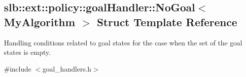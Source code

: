 \hypertarget{structslb_1_1ext_1_1policy_1_1goalHandler_1_1NoGoal}{}\subsection{slb\+:\+:ext\+:\+:policy\+:\+:goal\+Handler\+:\+:No\+Goal$<$ My\+Algorithm $>$ Struct Template Reference}
\label{structslb_1_1ext_1_1policy_1_1goalHandler_1_1NoGoal}


Handling conditions related to goal states for the case when the set of the goal states is empty.  




{\ttfamily \#include $<$goal\+\_\+handlers.\+h$>$}

